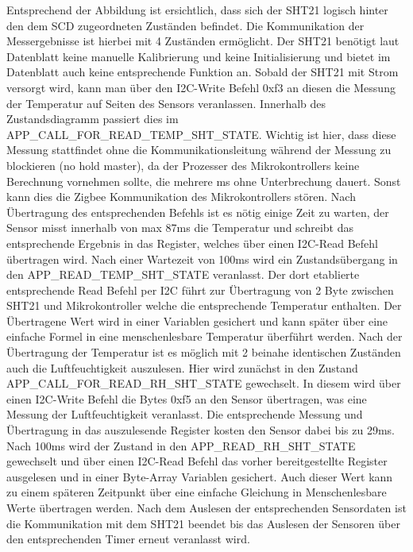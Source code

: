 \documentclass[]{article}
\begin{document}
		Entsprechend der Abbildung ist ersichtlich, dass sich der SHT21 logisch hinter den dem SCD zugeordneten Zuständen befindet. Die Kommunikation der Messergebnisse ist hierbei mit 4 Zuständen ermöglicht. Der SHT21 benötigt laut Datenblatt keine manuelle Kalibrierung und keine Initialisierung und bietet im Datenblatt auch keine entsprechende Funktion an. Sobald der SHT21 mit Strom versorgt wird, kann man über den I2C-Write Befehl 0xf3 an diesen die Messung der Temperatur auf Seiten des Sensors veranlassen. Innerhalb des Zustandsdiagramm passiert dies im APP\_CALL\_FOR\_READ\_TEMP\_SHT\_STATE. Wichtig ist hier, dass diese Messung stattfindet ohne die Kommunikationsleitung während der Messung zu blockieren (no hold master), da der Prozesser des Mikrokontrollers keine Berechnung vornehmen sollte, die mehrere ms ohne Unterbrechung dauert. Sonst kann dies die Zigbee Kommunikation des Mikrokontrollers stören. Nach Übertragung des entsprechenden Befehls ist es nötig einige Zeit zu warten, der Sensor misst innerhalb von max 87ms die Temperatur und schreibt das entsprechende Ergebnis in das Register, welches über einen I2C-Read Befehl übertragen wird. Nach einer Wartezeit von 100ms wird ein Zustandsübergang in den APP\_READ\_TEMP\_SHT\_STATE veranlasst. Der dort etablierte entsprechende Read Befehl per I2C führt zur Übertragung von 2 Byte zwischen SHT21 und Mikrokontroller welche die entsprechende Temperatur enthalten. Der Übertragene Wert wird in einer Variablen gesichert und kann später über eine einfache Formel in eine menschenlesbare Temperatur überführt werden. Nach der Übertragung der Temperatur ist es möglich mit 2 beinahe identischen Zuständen auch die Luftfeuchtigkeit auszulesen. Hier wird zunächst in den Zustand APP\_CALL\_FOR\_READ\_RH\_SHT\_STATE gewechselt. In diesem wird über einen I2C-Write Befehl die Bytes 0xf5 an den Sensor übertragen, was eine Messung der Luftfeuchtigkeit veranlasst. Die entsprechende Messung und Übertragung in das auszulesende Register kosten den Sensor dabei bis zu 29ms. Nach 100ms wird der Zustand in den APP\_READ\_RH\_SHT\_STATE gewechselt und über einen I2C-Read Befehl das vorher bereitgestellte Register ausgelesen und in einer Byte-Array Variablen gesichert. Auch dieser Wert kann zu einem späteren Zeitpunkt über eine einfache Gleichung in Menschenlesbare Werte übertragen werden. Nach dem Auslesen der entsprechenden Sensordaten ist die Kommunikation mit dem SHT21 beendet bis das Auslesen der Sensoren über den entsprechenden Timer erneut veranlasst wird.
		
\end{document}
